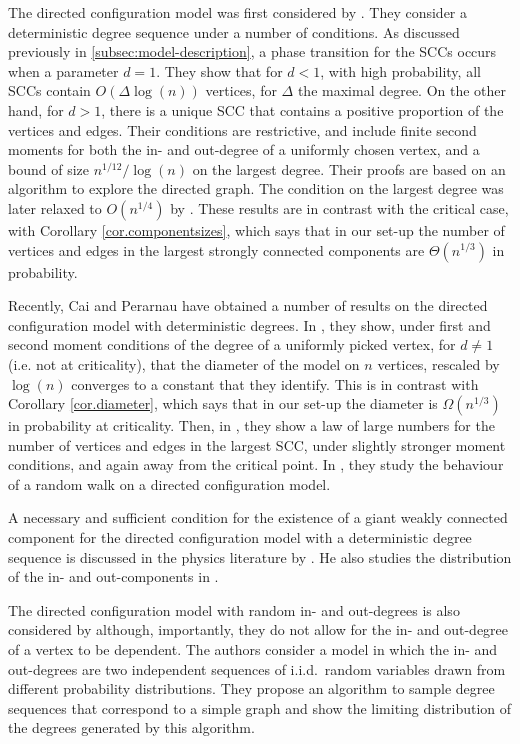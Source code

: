 The directed configuration model was first considered by \citet{cooperSizeLargestStrongly2004}. They consider a deterministic degree sequence under a number of conditions. As discussed previously in \cref{subsec:model-description}, a phase transition for the SCCs occurs when a parameter $d=1$. They show that for $d<1$, with high probability, all SCCs contain $O(\Delta\log(n))$ vertices, for $\Delta$ the maximal degree. On the other hand, for $d>1$, there is a unique SCC that contains a positive proportion of the vertices and edges. Their conditions are restrictive, and include finite second moments for both the in- and out-degree of a uniformly chosen vertex, and a bound of size $n^{1/12}/\log(n)$ on the largest degree. Their proofs are based on an algorithm to explore the directed graph. The condition on the largest degree was later relaxed to $O(n^{1/4})$ by \citet{grafStronglyConnectedComponents2016}. These results are in contrast with the critical case, with Corollary \ref{cor.componentsizes}, which says that in our set-up the number of vertices and edges in the largest strongly connected components are $\Theta(n^{1/3})$ in probability.

Recently, Cai and Perarnau have obtained a number of results on the directed configuration model with deterministic degrees. In \cite{caiDiameterDirectedConfiguration2020}, they show, under first and second moment conditions of the degree of a uniformly picked vertex, for $d\neq 1$ (i.e. not at criticality), that the diameter of the model on $n$ vertices, rescaled by $\log(n)$ converges to a constant that they identify. This is in contrast with Corollary \ref{cor.diameter}, which says that in our set-up the diameter is $\Omega(n^{1/3})$ in probability at criticality. Then, in \cite{caiGiantComponentDirected2021}, they show a law of large numbers for the number of vertices and edges in the largest SCC, under slightly stronger moment conditions, and again away from the critical point. In \cite{caiMinimumStationaryValues2021}, they study the behaviour of a random walk on a directed configuration model.
 
A necessary and sufficient condition for the existence of a giant weakly connected component for the directed configuration model with a deterministic degree sequence is discussed in the physics literature by \citet{kryvenEmergenceGiantWeak2016}. He also studies the distribution of the in- and out-components in \cite{kryvenFiniteConnectedComponents2017}.

The directed configuration model with random in- and out-degrees is also considered by \citet{chenDirectedRandomGraphs2013} although, importantly, they do not allow for the in- and out-degree of a vertex to be dependent. The authors consider a model in which the in- and out-degrees are two independent sequences of i.i.d.\ random variables drawn from different probability distributions. They propose an algorithm to sample degree sequences that correspond to a simple graph and show the limiting distribution of the degrees generated by this algorithm. 



